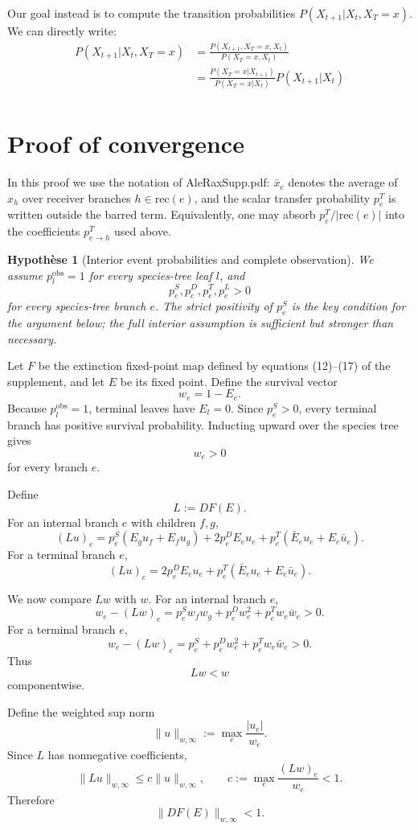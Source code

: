 \documentclass{article}
\newtheorem{assumption}{Hypothèse}
\newcommand{\1}{\mathbf{1}}
\newcommand{\rec}{\mathrm{rec}}
\begin{document}
Our goal instead is to compute the transition probabilities $P(X_{t+1}|X_t, X_T=x)$. We can directly write:
\begin{align*}
    P(X_{t+1}|X_t, X_T=x) &= \frac{P(X_{t+1}, X_T=x, X_t)}{P(X_T=x, X_t)}\\
    &= \frac{P(X_T=x|X_{t+1})}{P(X_T=x|X_t)}P(X_{t+1}|X_t)\\
\end{align*}
\section{Proof of convergence}
In this proof we use the notation of AleRaxSupp.pdf: $\bar x_e$ denotes the average of $x_h$ over receiver branches $h\in\rec(e)$, and the scalar transfer probability $p^T_e$ is written outside the barred term. Equivalently, one may absorb $p^T_e/|\rec(e)|$ into the coefficients $p^T_{e\to h}$ used above.

\begin{assumption}[Interior event probabilities and complete observation]
    We assume $p_l^{\mathrm{obs}}=1$ for every species-tree leaf $l$, and
    \[
        p_e^S,p_e^D,p_e^T,p_e^L>0
    \]
    for every species-tree branch $e$. The strict positivity of $p_e^S$ is the key condition for the argument below; the full interior assumption is sufficient but stronger than necessary.
\end{assumption}

Let $F$ be the extinction fixed-point map defined by equations (12)--(17) of the supplement, and let $E$ be its fixed point. Define the survival vector
\[
    w_e=1-E_e .
\]
Because $p_l^{\mathrm{obs}}=1$, terminal leaves have $E_l=0$. Since $p_e^S>0$, every terminal branch has positive survival probability. Inducting upward over the species tree gives
\[
    w_e>0
\]
for every branch $e$.

Define
\[
    L:=DF(E).
\]
For an internal branch $e$ with children $f,g$,
\[
    (Lu)_e
    =
    p_e^S(E_gu_f+E_fu_g)
    +2p_e^DE_eu_e
    +p_e^T(\bar E_eu_e+E_e\bar u_e).
\]
For a terminal branch $e$,
\[
    (Lu)_e
    =
    2p_e^DE_eu_e
    +p_e^T(\bar E_eu_e+E_e\bar u_e).
\]

We now compare $Lw$ with $w$. For an internal branch $e$,
\[
    w_e-(Lw)_e
    =
    p_e^S w_f w_g+p_e^D w_e^2+p_e^T w_e\bar w_e>0.
\]
For a terminal branch $e$,
\[
    w_e-(Lw)_e
    =
    p_e^S+p_e^D w_e^2+p_e^T w_e\bar w_e>0.
\]
Thus
\[
    Lw<w
\]
componentwise.

Define the weighted sup norm
\[
    \|u\|_{w,\infty}:=\max_e\frac{|u_e|}{w_e}.
\]
Since $L$ has nonnegative coefficients,
\[
    \|Lu\|_{w,\infty}
    \le
    c\|u\|_{w,\infty},
    \qquad
    c:=\max_e\frac{(Lw)_e}{w_e}<1.
\]
Therefore
\[
    \|DF(E)\|_{w,\infty}<1.
\]
\end{document}
